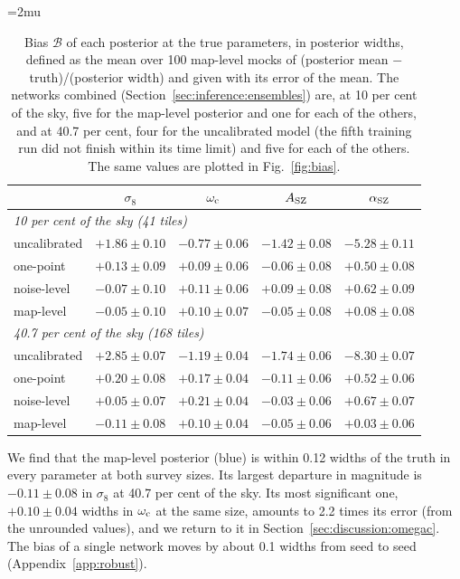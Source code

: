 \begin{table}
\centering
\caption{Bias $\mathcal{B}$ of each posterior at the true parameters, in posterior widths, defined as the
mean over 100 map-level mocks of (posterior mean $-$ truth)/(posterior width) and given with its error of
the mean. The networks combined (Section~\ref{sec:inference:ensembles}) are, at 10 per cent of the sky, five
for the map-level posterior and one for each of the others, and at 40.7 per cent, four for the uncalibrated
model (the fifth training run did not finish within its time limit) and five for each of the others. The
same values are plotted in Fig.~\ref{fig:bias}.}
\label{tab:bias}
\small
\medmuskip=2mu
\setlength{\tabcolsep}{2pt}
\begin{tabular}{@{}lcccc@{}}
\toprule
 & $\sigma_8$ & $\omega_\mathrm{c}$ & $A_\mathrm{SZ}$ & $\alpha_\mathrm{SZ}$ \\
\midrule
\multicolumn{5}{l}{\emph{10 per cent of the sky (41 tiles)}}\\
uncalibrated     & $+1.86\pm0.10$ & $-0.77\pm0.06$ & $-1.42\pm0.08$ & $-5.28\pm0.11$ \\
one-point        & $+0.13\pm0.09$ & $+0.09\pm0.06$ & $-0.06\pm0.08$ & $+0.50\pm0.08$ \\
noise-level      & $-0.07\pm0.10$ & $+0.11\pm0.06$ & $+0.09\pm0.08$ & $+0.62\pm0.09$ \\
map-level        & $-0.05\pm0.10$ & $+0.10\pm0.07$ & $-0.05\pm0.08$ & $+0.08\pm0.08$ \\
\midrule
\multicolumn{5}{l}{\emph{40.7 per cent of the sky (168 tiles)}}\\
uncalibrated     & $+2.85\pm0.07$ & $-1.19\pm0.04$ & $-1.74\pm0.06$ & $-8.30\pm0.07$ \\
one-point        & $+0.20\pm0.08$ & $+0.17\pm0.04$ & $-0.11\pm0.06$ & $+0.52\pm0.06$ \\
noise-level      & $+0.05\pm0.07$ & $+0.21\pm0.04$ & $-0.03\pm0.06$ & $+0.67\pm0.07$ \\
map-level        & $-0.11\pm0.08$ & $+0.10\pm0.04$ & $-0.05\pm0.06$ & $+0.03\pm0.06$ \\
\bottomrule
\end{tabular}
\end{table}

We find that the map-level posterior (blue) is within 0.12 widths of the truth in every parameter at both
survey sizes. Its largest departure in magnitude is $-0.11\pm0.08$ in $\sigma_8$ at 40.7 per cent of the
sky. Its most significant one, $+0.10\pm0.04$ widths in $\omega_\mathrm{c}$ at the same size, amounts to 2.2 times its
error (from the unrounded values), and we return to it in Section~\ref{sec:discussion:omegac}. The bias
of a single network moves by about 0.1 widths from seed to seed (Appendix~\ref{app:robust}).

